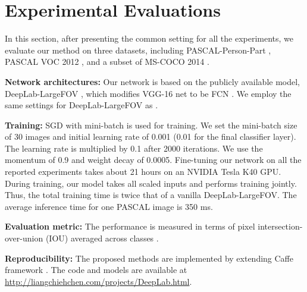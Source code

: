 \section{Experimental Evaluations}
\label{sec:exp}

In this section, after presenting the common setting for all the experiments, we evaluate our method on three datasets, including PASCAL-Person-Part \cite{chen_cvpr14}, PASCAL VOC 2012 \cite{everingham2014pascal}, and a subset of MS-COCO 2014 \cite{lin2014microsoft}.

\textbf{Network architectures:} Our network is based on the publicly available model, DeepLab-LargeFOV \cite{chen2014semantic}, which modifies VGG-16 net \cite{simonyan2014very} to be FCN \cite{long2014fully}. We employ the same settings for DeepLab-LargeFOV as \cite{chen2014semantic}.


\textbf{Training:} SGD with mini-batch is used for training. We set the mini-batch size of 30 images and initial learning rate of 0.001 (0.01 for the final classifier layer). The learning rate is multiplied by 0.1 after 2000 iterations. We use the momentum of 0.9 and weight decay of 0.0005. Fine-tuning our network on all the reported experiments takes about 21 hours on an NVIDIA Tesla K40 GPU. During training, our model takes all scaled inputs and performs training jointly. Thus, the total training time is twice that of a vanilla DeepLab-LargeFOV. The average inference time for one PASCAL image is 350 ms.

\textbf{Evaluation metric:} The performance is measured in terms of pixel intersection-over-union (IOU) averaged across classes \cite{everingham2014pascal}.

\textbf{Reproducibility:} The proposed methods are implemented by extending Caffe framework \cite{jia2014caffe}. The code and models are available at \url{http://liangchiehchen.com/projects/DeepLab.html}.

